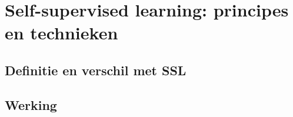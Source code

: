 \section{Self-supervised learning: principes en technieken}

\subsection{Definitie en verschil met SSL}

\subsection{Werking}